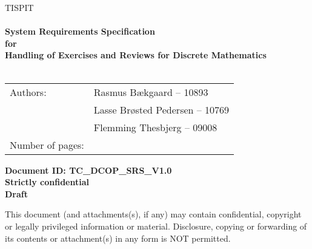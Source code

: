 \documentclass[Main]{subfiles}
\begin{document}
\begin{center}

\textsc{\Large TISPIT}\\[0.5cm]


\HRule \\[0.4cm]

{ \huge \bfseries System Requirements Specification}\\[0.4cm]
{ \huge \bfseries for}\\[0.4cm] 
{ \huge \bfseries Handling of Exercises and Reviews for Discrete Mathematics}\\[0.4cm]

\HRule \\[1.5cm]

\begin{tabular}{p{}|p{}}
\hline 
Authors: & Rasmus Bækgaard -- 10893\\ &Lasse Brøsted Pedersen -- 10769\\ &Flemming Thesbjerg -- 09008\\ 
\hline 
Number of pages: & \pageref{LastPage} \\
\hline 
\end{tabular} \vspace{40pt}

\textbf{\Large Document ID: TC\_DCOP\_SRS\_V1.0}\\
\textbf{\Large Strictly confidential}\\
\textbf{\Large Draft}

This document (and attachments(s), if any) may contain confidential, copyright or legally privileged information or material.
Disclosure, copying or forwarding of its contents or attachment(s) in any form is NOT permitted.
\end{center}
\end{document}
